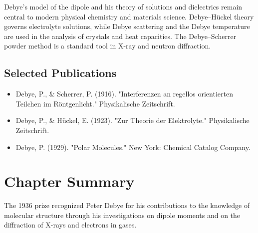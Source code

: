 Debye's model of the dipole and his theory of solutions and dielectrics remain central to modern physical chemistry and materials science. Debye–Hückel theory governs electrolyte solutions, while Debye scattering and the Debye temperature are used in the analysis of crystals and heat capacities. The Debye–Scherrer powder method is a standard tool in X-ray and neutron diffraction.

\subsection*{Selected Publications}

\begin{itemize}

\item Debye, P., \& Scherrer, P. (1916). "Interferenzen an regellos orientierten Teilchen im Röntgenlicht." Physikalische Zeitschrift.

\item Debye, P., \& Hückel, E. (1923). "Zur Theorie der Elektrolyte." Physikalische Zeitschrift.

\item Debye, P. (1929). "Polar Molecules." New York: Chemical Catalog Company.

\end{itemize}

\clearpage

\section*{Chapter Summary}

The 1936 prize recognized Peter Debye for his contributions to the knowledge of molecular structure through his investigations on dipole moments and on the diffraction of X-rays and electrons in gases.
